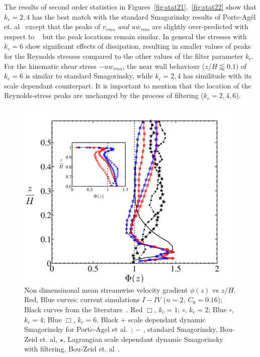 The results of second order statistics in Figures~\ref{fig:stat21},~\ref{fig:stat22} show that $k_c = 2,4$ has the best match with the standard Smagorinsky results of Porte-Ag\'{e}l et. al~\cite{porte1fun} except that the peaks of \textit{$v_{rms}$ and $uw_{rms}$}  are slightly over-predicted with respect to ~\cite{porte1fun} {but} the peak locations remain {similar}. {In general the stresses with $k_c = 6$ show significant effects of dissipation, resulting in smaller values of peaks for the Reynolds stresses compared to the other values of the filter parameter $k_c$}. For the kinematic shear stress $-uw_{rms}$, the near wall behaviour ($z/H \lessapprox 0.1$) of $k_c = 6$ is similar to standard Smagorinsky, while $k_c=2, 4$ has similitude with its scale dependant counterpart. It is important to mention that the location of the Reynolds-stress peaks are unchanged by the process of filtering ($k_c = 2, 4, 6$). 
\begin{figure}
\centering
\includegraphics[width = 0.75\linewidth]{Fig3/gradient_filt_n2.pdf}        
        \caption[$\Phi(z)$, Case $I-IV$]{Non dimensinonal mean streamwise velocity gradient $\phi(z)$ vs $z/H$. Red, Blue curves: current simulations $I-IV$ ($n = 2, \ C_0 = 0.16$); Black curves from the literature~\cite{porte1fun,bou1}. Red $\Box$, $k_{c}=1$; $\circ$, $k_{c}=2$; Blue $\circ$, $k_{c} = 4$; Blue $\Box$, $k_{c} = 6$. Black $+$ scale dependant dynamic Smagorinsky for Port$\acute{e}$-Agel et al.~\cite{porte1fun}; $-$ , standard Smagorinsky, Bou-Zeid et. al, $\star$, Lagrangian scale dependant dynamic Smagorinsky with filtering, Bou-Zeid et. al~\cite{bou1}.}\label{fig:stata}
\end{figure}

